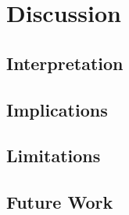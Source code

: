 \section{Discussion}
\label{sec:discussion}


\subsection{Interpretation}


\subsection{Implications}


\subsection{Limitations}


\subsection{Future Work}

